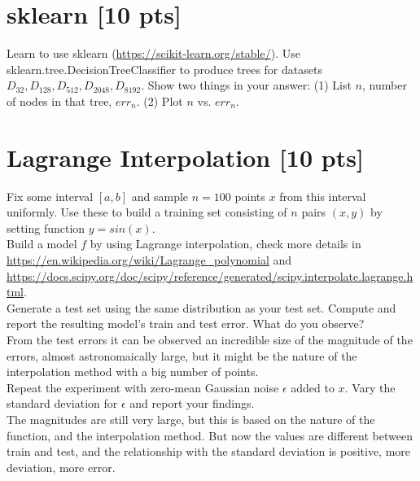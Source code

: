 \documentclass[a4paper]{article}
\theoremstyle{definition}
\begin{document}
\section{sklearn [10 pts]}
Learn to use sklearn (\url{https://scikit-learn.org/stable/}).
Use sklearn.tree.DecisionTreeClassifier to produce trees for datasets $D_{32}, D_{128}, D_{512}, D_{2048}, D_{8192}$.  Show two things in your answer: (1) List $n$, number of nodes in that tree, $err_n$. (2) Plot $n$ vs. $err_n$.

\section{Lagrange Interpolation [10 pts]}
Fix some interval $[a, b]$ and sample $n = 100$ points $x$ from this interval uniformly. Use these to build a training set consisting of $n$ pairs $(x, y)$ by setting function $y = sin(x)$. \\

Build a model $f$ by using Lagrange interpolation, check more details in \url{https://en.wikipedia.org/wiki/Lagrange_polynomial} and \url{https://docs.scipy.org/doc/scipy/reference/generated/scipy.interpolate.lagrange.html}. \\

Generate a test set using the same distribution as your test set. Compute and report the resulting model’s train and test error. What do you observe?\\

From the test errors it can be observed an incredible size of the magnitude of the errors, almost astronomaically large, but it might be the  nature of the interpolation method with a big number of points.\\

Repeat the experiment with zero-mean Gaussian noise $\epsilon$ added to $x$. Vary the standard deviation for $\epsilon$ and report your findings.\\

The magnitudes are still very large, but this is based on the nature of the function, and the interpolation method. But now the values are different between train and test, and the relationship with the standard deviation is positive, more deviation, more error.


\end{document}
